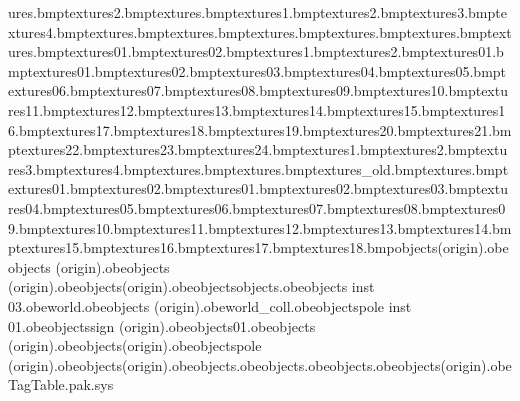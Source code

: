 ures\treeropes.bmp textures\treeropes2.bmp textures\treeropesend.bmp textures\treewall1.bmp textures\treewall2.bmp textures\treewall3.bmp textures\treewall4.bmp textures\tsamankles.bmp textures\tsambutton.bmp textures\tsamcollar.bmp textures\tsamteeth.bmp textures\tsamtie.bmp textures\vanpanel.bmp textures\vines01.bmp textures\vines02.bmp textures\wardensign1.bmp textures\wardensign2.bmp textures\water01.bmp textures\waterfall01.bmp textures\waterfall02.bmp textures\waterfall03.bmp textures\waterfall04.bmp textures\waterfall05.bmp textures\waterfall06.bmp textures\waterfall07.bmp textures\waterfall08.bmp textures\waterfall09.bmp textures\waterfall10.bmp textures\waterfall11.bmp textures\waterfall12.bmp textures\waterfall13.bmp textures\waterfall14.bmp textures\waterfall15.bmp textures\waterfall16.bmp textures\waterfall17.bmp textures\waterfall18.bmp textures\waterfall19.bmp textures\waterfall20.bmp textures\waterfall21.bmp textures\waterfall22.bmp textures\waterfall23.bmp textures\waterfall24.bmp textures\wbridge1.bmp textures\wbridge2.bmp textures\wbridge3.bmp textures\wbridge4.bmp textures\web.bmp textures\window.bmp textures\window_old.bmp textures\wires.bmp textures\woodblock01.bmp textures\woodblock02.bmp textures\wpaper01.bmp textures\wpaper02.bmp textures\wpaper03.bmp textures\wpaper04.bmp textures\wpaper05.bmp textures\wpaper06.bmp textures\wpaper07.bmp textures\wpaper08.bmp textures\wpaper09.bmp textures\wpaper10.bmp textures\wpaper11.bmp textures\wpaper12.bmp textures\wpaper13.bmp textures\wpaper14.bmp textures\wpaper15.bmp textures\wpaper16.bmp textures\wpaper17.bmp textures\wpaper18.bmp objects\bench  (origin).obe objects  (origin).obe objects (origin).obe objects\zoogater (origin).obe objects\invisible objects.obe objects inst 03.obe world.obe objects  (origin).obe world_coll.obe objects\telegraph pole inst 01.obe objects\city sign (origin).obe objects\box01.obe objects  (origin).obe objects\trashcan  (origin).obe objects\telegraph pole (origin).obe objects\zoogatel (origin).obe objects\camerapos.obe objects\cameralookat.obe objects\cameracases.obe objects\bush  (origin).obe TagTable.pak.sys 